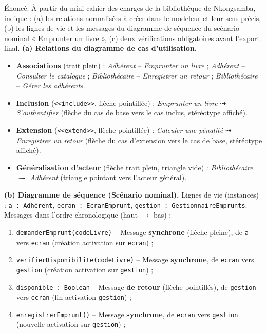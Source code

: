 \documentclass[11pt]{article}
\begin{document}
\begin{exoresolu}
Énoncé. À partir du mini-cahier des charges de la bibliothèque de Nkongsamba, indique : (a) les relations normalisées à créer dans le modeleur et leur sens précis, (b) les lignes de vie et les messages du diagramme de séquence du scénario nominal « Emprunter un livre », (c) deux vérifications obligatoires avant l'export final.
\tcblower
\textbf{(a) Relations du diagramme de cas d'utilisation.}
\begin{itemize}
\item \textbf{Associations} (trait plein) : \emph{Adhérent} -- \emph{Emprunter un livre} ; \emph{Adhérent} -- \emph{Consulter le catalogue} ; \emph{Bibliothécaire} -- \emph{Enregistrer un retour} ; \emph{Bibliothécaire} -- \emph{Gérer les adhérents}.
\item \textbf{Inclusion} (\texttt{<<include>>}, flèche pointillée) : \emph{Emprunter un livre} $\dashrightarrow$ \emph{S'authentifier} (flèche du cas de base vers le cas inclus, stéréotype affiché).
\item \textbf{Extension} (\texttt{<<extend>>}, flèche pointillée) : \emph{Calculer une pénalité} $\dashrightarrow$ \emph{Enregistrer un retour} (flèche du cas d'extension vers le cas de base, stéréotype affiché).
\item \textbf{Généralisation d'acteur} (flèche trait plein, triangle vide) : \emph{Bibliothécaire} $\rightharpoonup$ \emph{Adhérent} (triangle pointant vers l'acteur général).
\end{itemize}
\textbf{(b) Diagramme de séquence (Scénario nominal).} Lignes de vie (instances) : \texttt{a : Adhérent}, \texttt{ecran : EcranEmprunt}, \texttt{gestion : GestionnaireEmprunts}. Messages dans l'ordre chronologique (haut $\rightarrow$ bas) :
\begin{enumerate}
\item \texttt{demanderEmprunt(codeLivre)} -- Message \textbf{synchrone} (flèche pleine), de \texttt{a} vers \texttt{ecran} (création activation sur \texttt{ecran}) ;
\item \texttt{verifierDisponibilite(codeLivre)} -- Message \textbf{synchrone}, de \texttt{ecran} vers \texttt{gestion} (création activation sur \texttt{gestion}) ;
\item \texttt{disponible : Boolean} -- Message \textbf{de retour} (flèche pointillés), de \texttt{gestion} vers \texttt{ecran} (fin activation \texttt{gestion}) ;
\item \texttt{enregistrerEmprunt()} -- Message \textbf{synchrone}, de \texttt{ecran} vers \texttt{gestion} (nouvelle activation sur \texttt{gestion}) ;

\end{enumerate}
\end{exoresolu}
\end{document}
